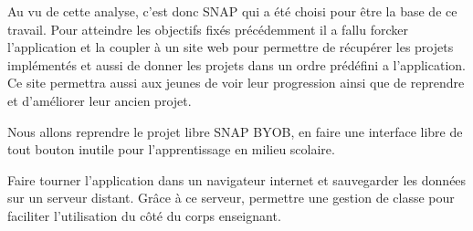Au vu de cette analyse, c'est donc SNAP qui a été choisi pour être la base de ce travail. Pour atteindre les objectifs fixés précédemment il a fallu forcker l'application et la coupler à un site web pour permettre de récupérer les projets implémentés et aussi de donner les projets dans un ordre prédéfini a l'application. Ce site permettra aussi aux jeunes de voir leur progression ainsi que de reprendre et d'améliorer leur ancien projet.

Nous allons reprendre le projet libre SNAP BYOB, en faire une interface libre de tout bouton inutile pour l'apprentissage en milieu scolaire. 

Faire tourner l'application dans un navigateur internet et sauvegarder les données sur un serveur distant. Grâce à ce serveur, permettre une gestion de classe pour faciliter l'utilisation du côté du corps enseignant.
